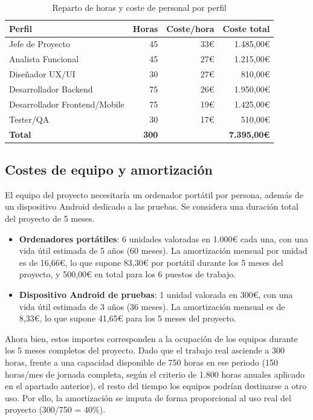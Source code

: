 \begin{table}[ht!]
\centering
\begin{tabular}{|l|r|r|r|}
\hline
\textbf{Perfil} & \textbf{Horas} & \textbf{Coste/hora} & \textbf{Coste total} \\
\hline
Jefe de Proyecto \cite{salarioJefeProyecto}          & 45  & 33€ & 1.485,00€ \\
\hline
Analista Funcional \cite{salarioAnalista}            & 45  & 27€ & 1.215,00€ \\
\hline
Diseñador UX/UI \cite{salarioUXUI}                   & 30  & 27€ &   810,00€ \\
\hline
Desarrollador Backend \cite{salarioBackend}          & 75  & 26€ & 1.950,00€ \\
\hline
Desarrollador Frontend/Mobile \cite{salarios}        & 75  & 19€ & 1.425,00€ \\
\hline
Tester/QA \cite{salarioTester}                       & 30  & 17€ &   510,00€ \\
\hline
\textbf{Total} & \textbf{300} & & \textbf{7.395,00€} \\
\hline
\end{tabular}
\caption{Reparto de horas y coste de personal por perfil}
\label{tab:horas_personal}
\end{table}

\subsection{Costes de equipo y amortización}

El equipo del proyecto necesitaría un ordenador portátil por persona, además de un dispositivo Android dedicado a las pruebas. Se considera una duración total del proyecto de 5 meses.

\begin{itemize}
    \item \textbf{Ordenadores portátiles}: 6 unidades valoradas en 1.000€ cada una, con una vida útil estimada de 5 años (60 meses). La amortización mensual por unidad es de 16,66€, lo que supone 83,30€ por portátil durante los 5 meses del proyecto, y 500,00€ en total para los 6 puestos de trabajo.
    \item \textbf{Dispositivo Android de pruebas}: 1 unidad valorada en 300€, con una vida útil estimada de 3 años (36 meses). La amortización mensual es de 8,33€, lo que supone 41,65€ para los 5 meses del proyecto.
\end{itemize}

Ahora bien, estos importes corresponden a la ocupación de los equipos durante los 5 meses completos del proyecto. Dado que el trabajo real asciende a 300 horas, frente a una capacidad disponible de 750 horas en ese periodo (150 horas/mes de jornada completa, según el criterio de 1.800 horas anuales aplicado en el apartado anterior), el resto del tiempo los equipos podrían destinarse a otro uso. Por ello, la amortización se imputa de forma proporcional al uso real del proyecto (300/750 = 40\%).

